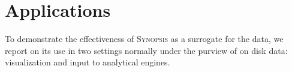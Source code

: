 \section{Applications}
\label{sec:applications}
To demonstrate the effectiveness of \textsc{Synopsis} as a surrogate for the data, we report on its use in two settings normally under the purview of on disk data: visualization and input to analytical engines.



